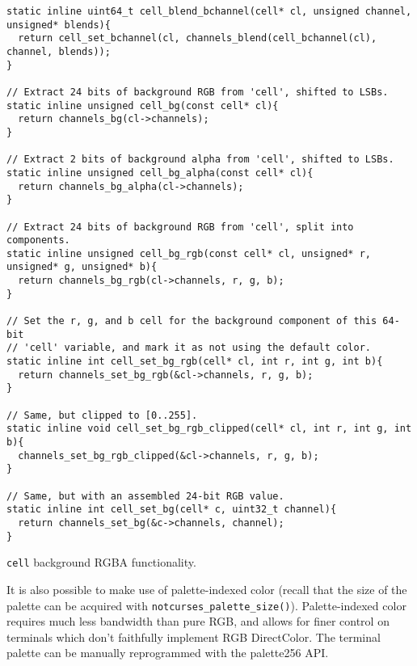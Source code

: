\begin{listing}[!htbp]
\begin{verbatim}
static inline uint64_t cell_blend_bchannel(cell* cl, unsigned channel, unsigned* blends){
  return cell_set_bchannel(cl, channels_blend(cell_bchannel(cl), channel, blends));
}

// Extract 24 bits of background RGB from 'cell', shifted to LSBs.
static inline unsigned cell_bg(const cell* cl){
  return channels_bg(cl->channels);
}

// Extract 2 bits of background alpha from 'cell', shifted to LSBs.
static inline unsigned cell_bg_alpha(const cell* cl){
  return channels_bg_alpha(cl->channels);
}

// Extract 24 bits of background RGB from 'cell', split into components.
static inline unsigned cell_bg_rgb(const cell* cl, unsigned* r, unsigned* g, unsigned* b){
  return channels_bg_rgb(cl->channels, r, g, b);
}

// Set the r, g, and b cell for the background component of this 64-bit
// 'cell' variable, and mark it as not using the default color.
static inline int cell_set_bg_rgb(cell* cl, int r, int g, int b){
  return channels_set_bg_rgb(&cl->channels, r, g, b);
}

// Same, but clipped to [0..255].
static inline void cell_set_bg_rgb_clipped(cell* cl, int r, int g, int b){
  channels_set_bg_rgb_clipped(&cl->channels, r, g, b);
}

// Same, but with an assembled 24-bit RGB value.
static inline int cell_set_bg(cell* c, uint32_t channel){
  return channels_set_bg(&c->channels, channel);
}
\end{verbatim}
\caption{\texttt{cell} background RGBA functionality.}
\label{listing:cellrgbbg}
\end{listing}

It is also possible to make use of palette-indexed color (recall that the size
of the palette can be acquired with \texttt{notcurses\_palette\_size()}). Palette-indexed
color requires much less bandwidth than pure RGB, and allows for finer control
on terminals which don't faithfully implement RGB DirectColor. The terminal
palette can be manually reprogrammed with the palette256 API.

